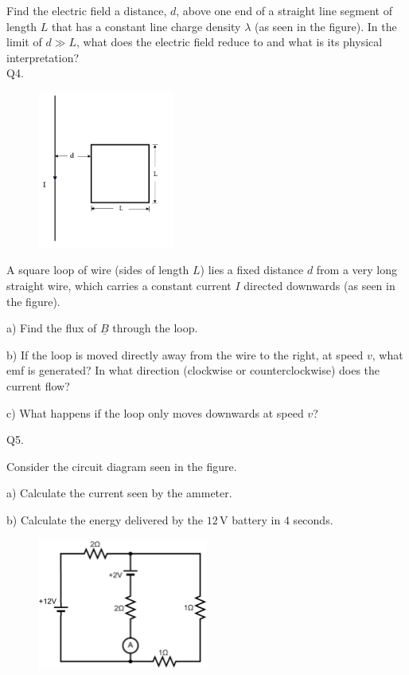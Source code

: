 \documentclass[a4paper,11pt]{article}
\begin{document}
Find the electric field a distance, \( d \), above one end of a straight line segment of length \( L \) that has a constant line charge density \( \lambda \) (as seen in the figure). In the limit of \( d \gg L \), what does the electric field reduce to and what is its physical interpretation? \\

Q4. 

\begin{figure}[t]
    \centering
    \includegraphics[width=0.4\textwidth]{EMq4figure.PNG}
    \caption*{}
\end{figure}

A square loop of wire (sides of length \( L \)) lies a fixed distance \( d \) from a very long straight wire, which carries a constant current \( I \) directed downwards (as seen in the figure).

\medskip

a) Find the flux of \( \underline{B} \) through the loop.

\medskip

b) If the loop is moved directly away from the wire to the right, at speed \( v \), what emf is generated? In what direction (clockwise or counterclockwise) does the current flow?

\medskip

c) What happens if the loop only moves downwards at speed \( v \)?

\newpage

Q5. 

Consider the circuit diagram seen in the figure. 

a) Calculate the current seen by the ammeter.

\medskip

b) Calculate the energy delivered by the \(12\, \text{V}\) battery in \(4\) seconds.

\begin{figure}[h!]
    \centering
    \includegraphics[width=0.5\textwidth]{EMq5figure.PNG}
    \caption*{}
\end{figure}
\end{document}
